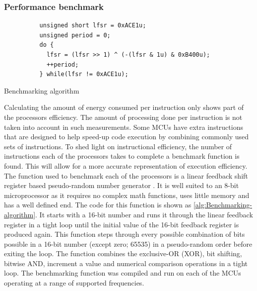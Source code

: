     \subsubsection*{Performance benchmark}

      \begin{algorithm}
        \begin{lstlisting}
          unsigned short lfsr = 0xACE1u;
          unsigned period = 0;
          do {
            lfsr = (lfsr >> 1) ^ (-(lfsr & 1u) & 0xB400u);
            ++period;
          } while(lfsr != 0xACE1u);
        \end{lstlisting}
        \caption{\label{alg:Benchmarking-algorithm}Benchmarking algorithm}
      \end{algorithm}

      Calculating the amount of energy consumed per instruction only shows part of the processors efficiency.
      The amount of processing done per instruction is not taken into account in such measurements.
      Some MCUs have extra instructions that are designed to help speed-up code execution by combining commonly used sets of instructions.
      To shed light on instructional efficiency, the number of instructions each of the processors takes to complete a benchmark function is found.
      This will allow for a more accurate representation of execution efficiency.
      The function used to benchmark each of the processors is a linear feedback shift register based pseudo-random number generator \cite{LinearFeedbackRegister}.
      It is well suited to an 8-bit microprocessor as it requires no complex math functions, uses little memory and has a well defined end.
      The code for this function is shown as \cref{alg:Benchmarking-algorithm}.
      It starts with a 16-bit number and runs it through the linear feedback register in a tight loop until the initial value of the 16-bit feedback register is produced again.
      This function steps through every possible combination of bits possible in a 16-bit number (except zero; 65535) in a pseudo-random order before exiting the loop.
      The function combines the exclusive-OR (XOR), bit shifting, bitwise AND, increment a value and numerical comparison operations in a tight loop.
      The benchmarking function was compiled and run on each of the MCUs operating at a range of supported frequencies.

